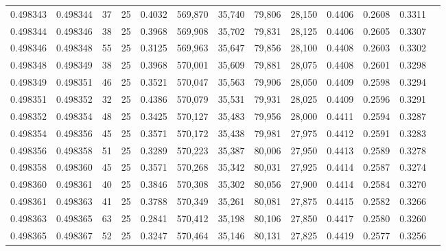 \begin{tabular}{rrrrrrrrrrrrr}
0.498343 & 0.498344 &    37 &  25 &                                     0.4032 & 569,870 &  35,740 &  79,806 &  28,150 & 0.4406 & 0.2608 & 0.3311 \\
0.498344 & 0.498346 &    38 &  25 &                                     0.3968 & 569,908 &  35,702 &  79,831 &  28,125 & 0.4406 & 0.2605 & 0.3307 \\
0.498346 & 0.498348 &    55 &  25 &                                     0.3125 & 569,963 &  35,647 &  79,856 &  28,100 & 0.4408 & 0.2603 & 0.3302 \\
0.498348 & 0.498349 &    38 &  25 &                                     0.3968 & 570,001 &  35,609 &  79,881 &  28,075 & 0.4408 & 0.2601 & 0.3298 \\
0.498349 & 0.498351 &    46 &  25 &                                     0.3521 & 570,047 &  35,563 &  79,906 &  28,050 & 0.4409 & 0.2598 & 0.3294 \\
0.498351 & 0.498352 &    32 &  25 &                                     0.4386 & 570,079 &  35,531 &  79,931 &  28,025 & 0.4409 & 0.2596 & 0.3291 \\
0.498352 & 0.498354 &    48 &  25 &                                     0.3425 & 570,127 &  35,483 &  79,956 &  28,000 & 0.4411 & 0.2594 & 0.3287 \\
0.498354 & 0.498356 &    45 &  25 &                                     0.3571 & 570,172 &  35,438 &  79,981 &  27,975 & 0.4412 & 0.2591 & 0.3283 \\
0.498356 & 0.498358 &    51 &  25 &                                     0.3289 & 570,223 &  35,387 &  80,006 &  27,950 & 0.4413 & 0.2589 & 0.3278 \\
0.498358 & 0.498360 &    45 &  25 &                                     0.3571 & 570,268 &  35,342 &  80,031 &  27,925 & 0.4414 & 0.2587 & 0.3274 \\
0.498360 & 0.498361 &    40 &  25 &                                     0.3846 & 570,308 &  35,302 &  80,056 &  27,900 & 0.4414 & 0.2584 & 0.3270 \\
0.498361 & 0.498363 &    41 &  25 &                                     0.3788 & 570,349 &  35,261 &  80,081 &  27,875 & 0.4415 & 0.2582 & 0.3266 \\
0.498363 & 0.498365 &    63 &  25 &                                     0.2841 & 570,412 &  35,198 &  80,106 &  27,850 & 0.4417 & 0.2580 & 0.3260 \\
0.498365 & 0.498367 &    52 &  25 &                                     0.3247 & 570,464 &  35,146 &  80,131 &  27,825 & 0.4419 & 0.2577 & 0.3256 \\

\end{tabular}
